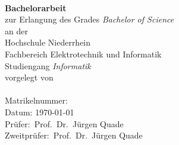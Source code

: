 \begin{titlepage}
	
\begin{center}
		\textbf{\Large \thesisTitle}\\[3cm]
		\textbf{Bachelorarbeit}\\
		zur Erlangung des Grades {\em Bachelor of Science}\\[1.5cm]
		
		an der\\
		Hochschule Niederrhein\\
		Fachbereich Elektrotechnik und Informatik\\
		Studiengang {\em Informatik}\\[3cm]
		
		vorgelegt von\\
		\thesisAuthor\\
		Matrikelnummer: \Matrikelnummer\\[3cm]
		Datum: \today\\[3cm]
		
		Prüfer:~Prof.~Dr.~Jürgen Quade\\
		Zweitprüfer:~Prof.~Dr.~Jürgen Quade
	\end{center}
\end{titlepage}